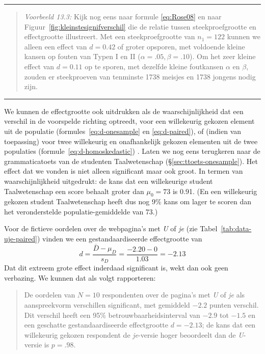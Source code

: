 \documentclass[
]{book}
\begin{document}
\begin{center}\rule{0.5\linewidth}{0.5pt}\end{center}

\begin{quote}
\emph{Voorbeeld 13.3:}
Kijk nog eens naar formule
\eqref{eq:Rose08}
en naar Figuur~\ref{fig:kleinstesignifverschil} die de relatie tussen
steekproefgrootte en effectgrootte illustreert. Met een
steekproefgrootte van \(n_1=122\) kunnen we alleen een effect van \(d=0.42\)
of groter opsporen, met voldoende kleine kansen op fouten van Typen I en
II (\(\alpha=.05, \beta=.10\)). Om het zeer kleine effect van \(d=0.11\) op
te sporen, met dezelfde kleine foutkansen \(\alpha\) en \(\beta\), zouden er
steekproeven van tenminste 1738 meisjes en 1738 jongens nodig zijn.
\end{quote}

\begin{center}\rule{0.5\linewidth}{0.5pt}\end{center}

We kunnen de effectgrootte ook uitdrukken als de waarschijnlijkheid dat
een verschil in de voorspelde richting optreedt, voor een willekeurig
gekozen element uit de populatie
(formules~\eqref{eq:d-onesample} en \eqref{eq:d-paired}),
of (indien van toepassing) voor twee
willekeurig en onafhankelijk gekozen elementen uit de twee populaties
(formule~\eqref{eq:d-homoskedastic}) \citep{McGraw92}. Laten we nog eens
terugkeren naar de grammaticatoets van de studenten Taalwetenschap
(§\ref{sec:ttoets-onesample}). Het effect dat we vonden is niet
alleen significant maar ook groot. In termen van waarschijnlijkheid
uitgedrukt: de kans dat een willekeurige student Taalwetenschap een
score behaalt groter dan \(\mu_0=73\) is 0.91. (En een willekeurig gekozen
student Taalwetenschap heeft dus nog 9\% kans om lager te scoren dan het
veronderstelde populatie-gemiddelde van 73.)

Voor de fictieve oordelen over de webpagina's met \emph{U} of \emph{je} (zie
Tabel~\ref{tab:data-uje-paired}) vinden we een gestandaardiseerde
effectgrootte van
\[d = \frac{ \overline{D}-\mu_D} {s_D} = \frac{ -2.20-0 } {1.03} = -2.13\]
Dat dit extreem grote effect inderdaad significant is, wekt dan ook geen
verbazing. We kunnen dat als volgt rapporteren:

\begin{quote}
De oordelen van \(N=10\) respondenten over de pagina's met \emph{U} of \emph{je}
als aanspreekvorm verschillen significant, met gemiddeld \(-2.2\) punten
verschil. Dit verschil heeft een 95\% betrouwbaarheidsinterval van
\(-2.9\) tot \(-1.5\) en een geschatte gestandaardiseerde effectgrootte
\(d=-2.13\); de kans dat een willekeurig gekozen respondent de
\emph{je}-versie hoger beoordeelt dan de \emph{U}-versie is \(p=.98\).
\end{quote}
\end{document}
